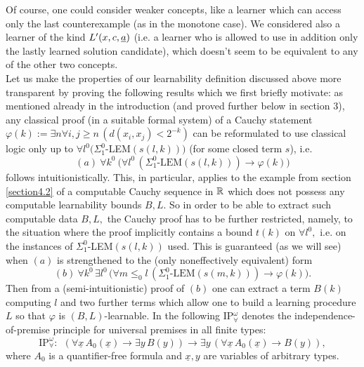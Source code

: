 Of course, one could consider weaker concepts, like a learner which can access only the last counterexample (as in the monotone case). We considered also a learner of the kind $L'(x,c,\underline a)$ (i.e. a learner who is allowed to use in addition only the lastly learned solution candidate), which doesn't seem to be equivalent to any of the other two concepts.\\[2mm]
Let us make the properties of our learnability definition discussed above 
more transparent by proving the following results which we first briefly 
motivate: as mentioned already in the introduction (and proved further 
below in section 3), any classical proof (in a suitable formal system) 
of a Cauchy statement $\varphi(k):=\exists n\forall i,j\ge n \,(d(x_i,x_j)<2^{-k})$ can be reformulated to use classical logic 
only up to $\forall l^0 (\Sigma^0_1$-LEM$(s(l,k)))$ (for some closed term 
$s$), i.e. 
\[ (a) \ 
\forall k^0 \ \big( \forall l^0\,(\Sigma^0_1\mbox{-LEM}(s(l,k)))\rightarrow 
\varphi(k)) \] 
follows intuitionistically. This, in particular, applies to the example 
from section \ref{section4.2} of a computable Cauchy sequence in $\mathbb{R}$ which 
does not possess any computable learnability bounds $B,L.$ So in order to be 
able to extract such computable data $B,L,$ the Cauchy proof has to be further 
restricted, namely, to the situation where the proof implicitly contains a 
bound $t(k)$ on $\forall l^0,$ i.e. on the instances of 
$\Sigma^0_1$-LEM$(s(l,k))$ used. This is guaranteed (as we will see) when 
$(a)$ is strengthened to the (only noneffectively equivalent) form 
\[ (b) \ \forall k^0 \,\exists l^0\, 
\big( \forall m\le_0 l \,(\Sigma^0_1\mbox{-LEM}(s(m,k)))
\rightarrow 
\varphi(k)). \]  Then from a (semi-intuitionistic) proof of $(b)$ 
one can extract a term $B(k)$ computing $l$ and two further terms which 
allow one to build a learning procedure $L$ so that $\varphi$ is 
$(B,L)$-learnable. 
In the following IP$^{\omega}_{\forall}$ denotes 
the independence-of-premise principle for universal 
premises in all finite types:
\[\mbox{IP}^{\omega}_{\forall}: \ \ (\forall \underline{x}\,A_0(\underline{x})
\to\exists y \,
B(y))\rightarrow \exists y\,( \forall \underline{x}\,
A_0(\underline{x})\to B(y)), \]
where $A_0$ is a quantifier-free formula and $\underline{x},y$ are 
variables of 
arbitrary types.
